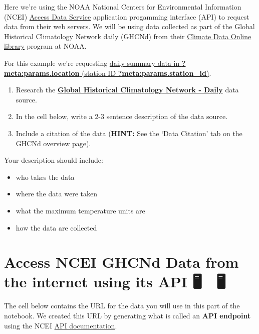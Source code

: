 \documentclass[
  letterpaper,
  DIV=11,
  numbers=noendperiod,
  oneside]{scrreprt}
\providecommand{\tightlist}{%
  \setlength{\itemsep}{0pt}\setlength{\parskip}{0pt}}
\begin{document}
Here we're using the NOAA National Centers for Environmental Information
(NCEI)
\href{https://www.ncei.noaa.gov/support/access-data-service-api-user-documentation}{Access
Data Service} application progamming interface (API) to request data
from their web servers. We will be using data collected as part of the
Global Historical Climatology Network daily (GHCNd) from their
\href{https://www.ncdc.noaa.gov/cdo-web/datasets}{Climate Data Online
library} program at NOAA.

For this example we're requesting
\href{https://www.ncdc.noaa.gov/cdo-web/datasets/GHCND/stations/GHCND:?meta:params.station_id/detail}{daily
summary data in \textbf{?meta:params.location} (station ID
\textbf{?meta:params.station\_id})}.

\begin{enumerate}
\def\labelenumi{\arabic{enumi}.}
\tightlist
\item
  Research the
  \href{https://www.ncei.noaa.gov/metadata/geoportal/rest/metadata/item/gov.noaa.ncdc:C00861/html}{\textbf{Global
  Historical Climatology Network - Daily}} data source.
\item
  In the cell below, write a 2-3 sentence description of the data
  source.
\item
  Include a citation of the data (\textbf{HINT:} See the `Data Citation'
  tab on the GHCNd overview page).
\end{enumerate}

Your description should include:

\begin{itemize}
\tightlist
\item
  who takes the data
\item
  where the data were taken
\item
  what the maximum temperature units are
\item
  how the data are collected
\end{itemize}

\section{Access NCEI GHCNd Data from the internet using its API 🖥️ 📡
🖥️}\label{access-ncei-ghcnd-data-from-the-internet-using-its-api}

The cell below contains the URL for the data you will use in this part
of the notebook. We created this URL by generating what is called an
\textbf{API endpoint} using the NCEI
\href{https://www.ncei.noaa.gov/support/access-data-service-api-user-documentation}{API
documentation}.
\end{document}
